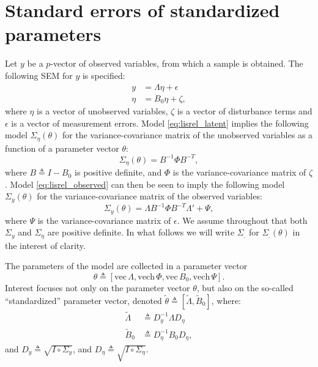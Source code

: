 \documentclass[a4paper, 11pt]{article}
\newcommand{\n}{\eta}
\newcommand{\definedas}{\triangleq}
\newcommand{\hadaprod}{\circ}
\renewcommand{\vec}{\mathrm{vec}\,}
\newcommand{\vech}{\mathrm{vech}\,}
\newcommand{\Lambdastan}{\tilde{\Lambda}}
\newcommand{\Bstan}{\tilde{B}}
\newcommand{\thetastan}{\tilde{\theta}}
\newcommand{\0}{\boldsymbol{0}}
\begin{document}
\section{Standard errors of standardized parameters}

Let $y$ be a $p$-vector of observed variables, from which a sample is obtained.
The following SEM for $y$ is specified:
\begin{align}
\label{eq:lisrel_observed}
y &= \Lambda \n + \epsilon\\
\n &= B_0 \n + \zeta,\label{eq:lisrel_latent}
\end{align}
where $\n$ is a vector of unobserved variables, $\zeta$ is a vector of
disturbance terms and $\epsilon$ is a vector of measurement errors. Model
\ref{eq:lisrel_latent} implies the following model
$\Sigma_\n(\theta)$ for the variance-covariance matrix of the unobserved
variables as a function of a parameter vector $\theta$: 
\begin{equation}\label{eq:sigma_n}
    \Sigma_\n(\theta) = B^{-1} \Phi B^{-T},
\end{equation}
where $B \definedas I - B_0$ is positive definite, 
and $\Phi$ is the variance-covariance
matrix of $\zeta$. Model \ref{eq:lisrel_observed} can then be seen to imply the
following model $\Sigma_y(\theta)$ for the variance-covariance matrix of the
observed variables:
\begin{equation}\label{eq:sigma_y}
    \Sigma_y(\theta) = \Lambda B^{-1} \Phi B^{-T} \Lambda' + \Psi,
\end{equation}
where  $\Psi$ is the variance-covariance matrix of $\epsilon$. 
We assume throughout that both $\Sigma_y$ and $\Sigma_\n$ are positive
definite. In what follows we will write $\Sigma_.$ for $\Sigma_.(\theta)$ in
the interest of clarity.

The parameters of the model are collected in a parameter
vector $$\theta \definedas [\vec{\Lambda}, \vech{\Phi}, \vec B_0, \vech
\Psi].$$
Interest focuses not only on the parameter vector $\theta$, 
but also on the so-called ``standardized'' parameter vector, denoted
$\thetastan \definedas [\Lambdastan, \Bstan_0]$, where:
\begin{align}\label{eq:lambda_s}
    \Lambdastan &\definedas D^{-1}_y \Lambda D_\n
    \\
    \Bstan_0 &\definedas D^{-1}_\n B_0 D_\n,\label{eq:beta_s}
\end{align}
and $D_y \definedas \sqrt{I \hadaprod \Sigma_y}$, and 
$D_\n \definedas \sqrt{I \hadaprod \Sigma_\n}$. 
\end{document}
